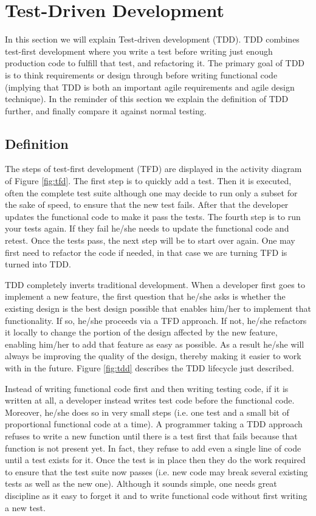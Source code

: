 \section{Test-Driven Development}
\label{sec:tdd}
In this section we will explain Test-driven development (TDD). TDD combines test-first development where you write a test before writing just enough production code to fulfill that test, and refactoring it. The primary goal of TDD is to think requirements or design through before writing functional code (implying that TDD is both an important agile requirements and agile design technique)\cite{Martin2002}. In the reminder of this section we explain the definition of TDD further, and finally compare it against normal testing.
\subsection{Definition}
The steps of test-first development (TFD) are displayed in the activity diagram of Figure \ref{fig:tfd}. The first step is to quickly add a test. Then it is executed, often the complete test suite although one may decide to run only a subset for the sake of speed, to ensure that the new test fails. After that the developer updates the functional code to make it pass the tests. The fourth step is to run your tests again. If they fail he/she needs to update the functional code and retest. Once the tests pass, the next step will be to start over again. One may first need to refactor the code if needed, in that case we are turning TFD is turned into TDD.

TDD completely inverts traditional development. When a developer first goes to implement a new feature, the first question that he/she asks is whether the existing design is the best design possible that enables him/her to implement that functionality. If so, he/she proceeds via a TFD approach. If not, he/she refactors it locally to change the portion of the design affected by the new feature, enabling him/her to add that feature as easy as possible. As a result he/she will always be improving the quality of the design, thereby making it easier to work with in the future. Figure \ref{fig:tdd} describes the TDD lifecycle just described.

Instead of writing functional code first and then writing testing code, if it is written at all, a developer instead writes test code before the functional code. Moreover, he/she does so in very small steps (i.e. one test and a small bit of proportional functional code at a time). A programmer taking a TDD approach refuses to write a new function until there is a test first that fails because that function is not present yet. In fact, they refuse to add even a single line of code until a test exists for it. Once the test is in place then they do the work required to ensure that the test suite now passes (i.e. new code may break several existing tests as well as the new one). Although it sounds simple, one needs great discipline as it easy to forget it and to write functional code without first writing a new test.

